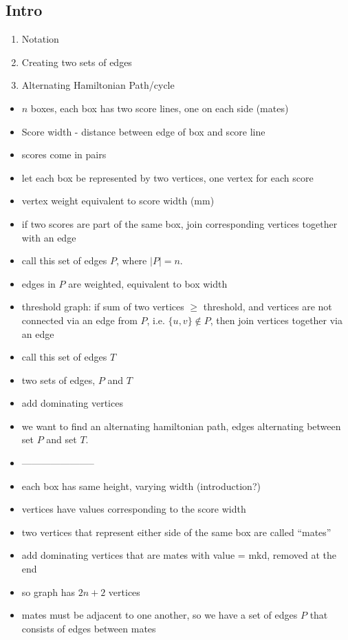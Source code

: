 \documentclass{llncs}
\begin{document}
\subsection{Intro}
\begin{enumerate}
	\item Notation
	\item Creating two sets of edges
	\item Alternating Hamiltonian Path/cycle
\end{enumerate}
\begin{itemize}
	\item $n$ boxes, each box has two score lines, one on each side (mates)
	\item Score width - distance between edge of box and score line
	\item scores come in pairs
	\item let each box be represented by two vertices, one vertex for each score
	\item vertex weight equivalent to score width (mm)
	\item if two scores are part of the same box, join corresponding vertices together with an edge
	\item call this set of edges $P$, where $|P| = n$.
	\item edges in $P$ are weighted, equivalent to box width
	\item threshold graph: if sum of two vertices $\geq$ threshold, and vertices are not connected via an edge from $P$, i.e. $\{u, v\} \notin P$, then join vertices together via an edge
	\item call this set of edges $T$
	\item two sets of edges, $P$ and $T$
	\item add dominating vertices
	\item we want to find an alternating hamiltonian path, edges alternating between set $P$ and set $T$.
	\item -----------------------
	\item each box has same height, varying width (introduction?)
	\item vertices have values corresponding to the score width
	\item two vertices that represent either side of the same box are called ``mates''
	\item add dominating vertices that are mates with value = mkd, removed at the end
	\item so graph has $2n + 2$ vertices
	\item mates must be adjacent to one another, so we have a set of edges $P$ that consists of edges between mates

\end{itemize}
\end{document}
